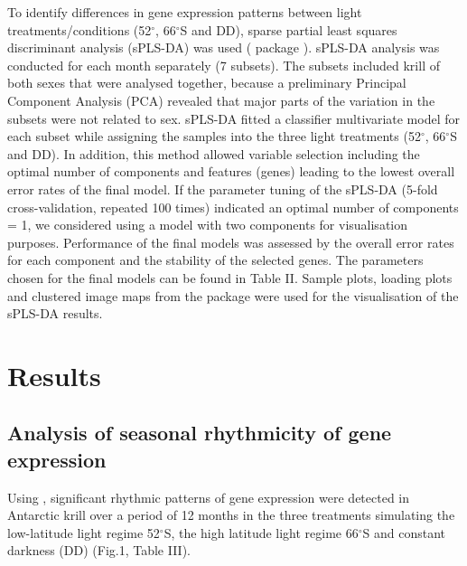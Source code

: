 To identify differences in gene expression patterns between light
treatments/conditions (52$^{\circ}$, 66$^{\circ}$S and DD), sparse partial
least squares discriminant analysis (sPLS-DA) was used ( package
 \citep{rohart_mixomics:_2017}). sPLS-DA analysis was conducted
for each month separately (7 subsets). The subsets included krill of both sexes
that were analysed together, because a preliminary Principal Component Analysis
(PCA) revealed that major parts of the variation in the subsets were not
related to sex. sPLS-DA fitted a classifier multivariate model for each subset
while assigning the samples into the three light treatments (52$^{\circ}$,
66$^{\circ}$S and DD). In addition, this method allowed variable selection
including the optimal number of components and features (genes) leading to the
lowest overall error rates of the final model. If the parameter tuning of the
sPLS-DA (5-fold cross-validation, repeated 100 times) indicated an optimal
number of components = 1, we considered using a model with two components for
visualisation purposes. Performance of the final models was assessed by the
overall error rates for each component and the stability of the selected genes.
The parameters chosen for the final models can be found in Table II. Sample
plots, loading plots and clustered image maps from the  package
 were used for the visualisation of the sPLS-DA results.





\section{Results}

\subsection{Analysis of seasonal rhythmicity of gene expression}

Using , significant rhythmic patterns of gene expression were
detected in Antarctic krill over a period of 12 months in the three treatments
simulating the low-latitude light regime 52$^{\circ}$S, the high latitude light
regime 66$^{\circ}$S and constant darkness (DD) (Fig.1, Table III).


